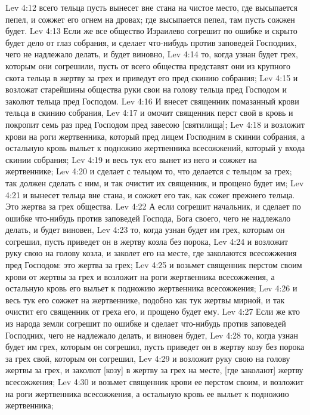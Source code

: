 Lev 4:12  всего тельца пусть вынесет вне стана на чистое место, где высыпается пепел, и сожжет его огнем на дровах; где высыпается пепел, там пусть сожжен будет.
Lev 4:13  Если же все общество Израилево согрешит по ошибке и скрыто будет дело от глаз собрания, и сделает что-нибудь против заповедей Господних, чего не надлежало делать, и будет виновно,
Lev 4:14  то, когда узнан будет грех, которым они согрешили, пусть от всего общества представят они из крупного скота тельца в жертву за грех и приведут его пред скинию собрания;
Lev 4:15  и возложат старейшины общества руки свои на голову тельца пред Господом и заколют тельца пред Господом.
Lev 4:16  И внесет священник помазанный крови тельца в скинию собрания,
Lev 4:17  и омочит священник перст свой в кровь и покропит семь раз пред Господом пред завесою [святилища];
Lev 4:18  и возложит крови на роги жертвенника, который пред лицем Господним в скинии собрания, а остальную кровь выльет к подножию жертвенника всесожжений, который у входа скинии собрания;
Lev 4:19  и весь тук его вынет из него и сожжет на жертвеннике;
Lev 4:20  и сделает с тельцом то, что делается с тельцом за грех; так должен сделать с ним, и так очистит их священник, и прощено будет им;
Lev 4:21  и вынесет тельца вне стана, и сожжет его так, как сожег прежнего тельца. Это жертва за грех общества.
Lev 4:22  А если согрешит начальник, и сделает по ошибке что-нибудь против заповедей Господа, Бога своего, чего не надлежало делать, и будет виновен,
Lev 4:23  то, когда узнан будет им грех, которым он согрешил, пусть приведет он в жертву козла без порока,
Lev 4:24  и возложит руку свою на голову козла, и заколет его на месте, где заколаются всесожжения пред Господом: это жертва за грех;
Lev 4:25  и возьмет священник перстом своим крови от жертвы за грех и возложит на роги жертвенника всесожжения, а остальную кровь его выльет к подножию жертвенника всесожжения;
Lev 4:26  и весь тук его сожжет на жертвеннике, подобно как тук жертвы мирной, и так очистит его священник от греха его, и прощено будет ему.
Lev 4:27  Если же кто из народа земли согрешит по ошибке и сделает что-нибудь против заповедей Господних, чего не надлежало делать, и виновен будет,
Lev 4:28  то, когда узнан будет им грех, которым он согрешил, пусть приведет он в жертву козу без порока за грех свой, которым он согрешил,
Lev 4:29  и возложит руку свою на голову жертвы за грех, и заколют [козу] в жертву за грех на месте, [где заколают] жертву всесожжения;
Lev 4:30  и возьмет священник крови ее перстом своим, и возложит на роги жертвенника всесожжения, а остальную кровь ее выльет к подножию жертвенника;
